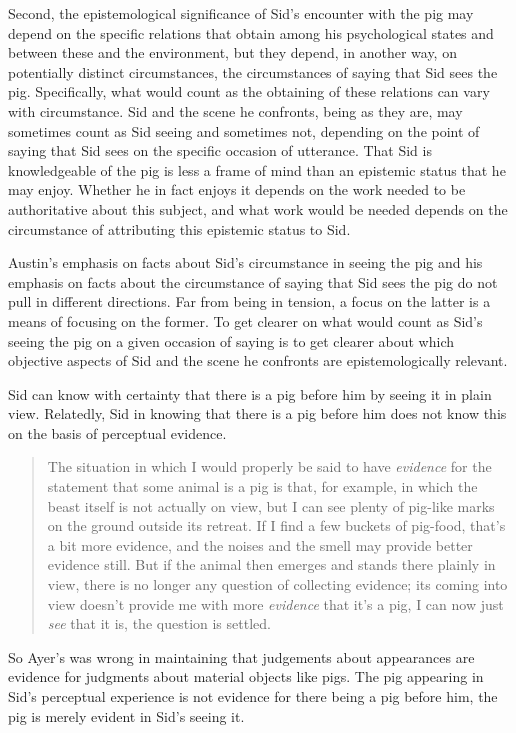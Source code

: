 Second, the epistemological significance of Sid's encounter with the pig may depend on the specific relations that obtain among his psychological states and between these and the environment, but they depend, in another way, on potentially distinct circumstances, the circumstances of saying that Sid sees the pig. Specifically, what would count as the obtaining of these relations can vary with circumstance. Sid and the scene he confronts, being as they are, may sometimes count as Sid seeing and sometimes not, depending on the point of saying that Sid sees on the specific occasion of utterance. That Sid is knowledgeable of the pig is less a frame of mind than an epistemic status that he may enjoy. Whether he in fact enjoys it depends on the work needed to be authoritative about this subject, and what work would be needed depends on the circumstance of attributing this epistemic status to Sid.

Austin's emphasis on facts about Sid's circumstance in seeing the pig and his emphasis on facts about the circumstance of saying that Sid sees the pig do not pull in different directions. Far from being in tension, a focus on the latter is a means of focusing on the former. To get clearer on what would count as Sid's seeing the pig on a given occasion of saying is to get clearer about which objective aspects of Sid and the scene he confronts are epistemologically relevant.

Sid can know with certainty that there is a pig before him by seeing it in plain view. Relatedly, Sid in knowing that there is a pig before him does not know this on the basis of perceptual evidence.
\begin{quote}
    The situation in which I would properly be said to have \emph{evidence} for the statement that some animal is a pig is that, for example, in which the beast itself is not actually on view, but I can see plenty of pig-like marks on the ground outside its retreat. If I find a few buckets of pig-food, that’s a bit more evidence, and the noises and the smell may provide better evidence still. But if the animal then emerges and stands there plainly in view, there is no longer any question of collecting evidence; its coming into view doesn’t provide me with more \emph{evidence} that it’s a pig, I can now just \emph{see} that it is, the question is settled. \citep[115]{Austin:1962lr}
\end{quote}
So Ayer's was wrong in maintaining that judgements about appearances are evidence for judgments about material objects like pigs. The pig appearing in Sid's perceptual experience is not evidence for there being a pig before him, the pig is merely evident in Sid's seeing it. 

